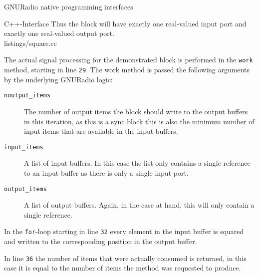 \begin{subchapter}{GNURadio native programming interfaces}
\begin{subsubchapter}{C++-Interface}
    Thus the block will have exactly one real-valued input port and exactly
    one real-valued output port. \\

    
                    {listings/square.cc}

    The actual signal processing for the demonstrated block
    is performed in the \texttt{work} method, starting in line
    \texttt{29}. The work method is passed the following arguments
    by the underlying GNURadio logic:

    \begin{description}
      \item[\texttt{noutput\_items}]
        The number of output items the block should write to the output
        buffers in this iteration, as this is a sync block this is also
        the minimum number of input items that are available in the input buffers.

      \item[\texttt{input\_items}]
        A list of input buffers. In this case the list only contains
        a single reference to an input buffer as there is only a
        single input port.

      \item[\texttt{output\_items}]
        A list of output buffers. Again, in the case at hand,
        this will only contain a single reference.
    \end{description}
  \end{subsubchapter}

  In the \texttt{for}-loop starting in line \texttt{32}
  every element in the input buffer is squared and written to
  the corresponding position in the output buffer.

  In line \texttt{36} the number of items that were actually consumed
  is returned, in this case it is equal to the number of items
  the method was requested to produce.
\end{subchapter}

